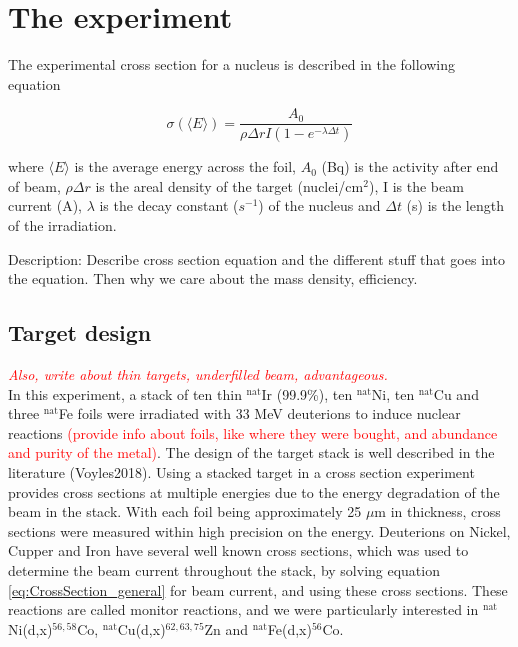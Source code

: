 

\section{The experiment}



The experimental cross section for a nucleus is described in the following equation

\begin{equation} \label{eq:CrossSection_general}
    \sigma(\langle E \rangle) = \frac{A_0}{\rho\Delta r I (1-e^{-\lambda \Delta t})}
\end{equation}



where $\langle E \rangle$ is the average energy across the foil, $A_0$ (Bq) is the activity after end of beam, $\rho \Delta r$ is the areal density of the target (nuclei/cm$^2$), I is the beam current (A), $\lambda$ is the decay constant ($s^{-1}$) of the nucleus and $\Delta t$ (s) is the length of the irradiation. %

Description: Describe cross section equation and the different stuff that goes into the equation. Then why we care about the mass density, efficiency. 



\subsection{Target design}
\textit{\textcolor{red}{Also, write about thin targets, underfilled beam, advantageous.}}\\

\noindent 
In this experiment, a stack of ten thin $^{\text{nat}}$Ir (99.9\%), ten $^{\text{nat}}$Ni, ten $^{\text{nat}}$Cu and three $^{\text{nat}}$Fe foils were irradiated with 33 MeV deuterions to induce nuclear reactions  \textcolor{red}{(provide info about foils, like where they were bought, and abundance and purity of the metal)}. The design of the target stack is well described in the literature (Voyles2018). Using a stacked target in a cross section experiment provides cross sections at multiple energies due to the energy degradation of the beam in the stack. With each foil being approximately 25 $\mu$m in thickness, cross sections were measured within high precision on the energy. Deuterions on Nickel, Cupper and Iron have several well known cross sections, which was used to determine the beam current throughout the stack, by solving equation \ref{eq:CrossSection_general} for beam current, and using these cross sections. These reactions are called monitor reactions, and we were particularly interested in $^{\text{nat}}$Ni(d,x)$^{56,58}$Co, $^{\text{nat}}$Cu(d,x)$^{62, 63, 75}$Zn and $^{\text{nat}}$Fe(d,x)$^{56}$Co.  \\ 

